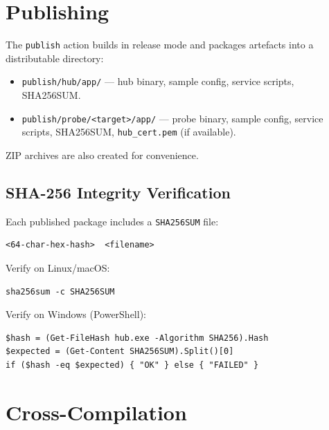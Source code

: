 \documentclass[12pt]{report}
\begin{document}
\section{Publishing}

The \texttt{publish} action builds in release mode and packages artefacts
into a distributable directory:

\begin{itemize}
    \item \texttt{publish/hub/app/} --- hub binary, sample config, service
          scripts, SHA256SUM.
    \item \texttt{publish/probe/<target>/app/} --- probe binary, sample
          config, service scripts, SHA256SUM, \texttt{hub\_cert.pem} (if
          available).
\end{itemize}

ZIP archives are also created for convenience.

\subsection{SHA-256 Integrity Verification}

Each published package includes a \texttt{SHA256SUM} file:

\begin{lstlisting}
<64-char-hex-hash>  <filename>
\end{lstlisting}

Verify on Linux/macOS:

\begin{lstlisting}
sha256sum -c SHA256SUM
\end{lstlisting}

Verify on Windows (PowerShell):

\begin{lstlisting}
$hash = (Get-FileHash hub.exe -Algorithm SHA256).Hash
$expected = (Get-Content SHA256SUM).Split()[0]
if ($hash -eq $expected) { "OK" } else { "FAILED" }
\end{lstlisting}

\section{Cross-Compilation}
\end{document}
